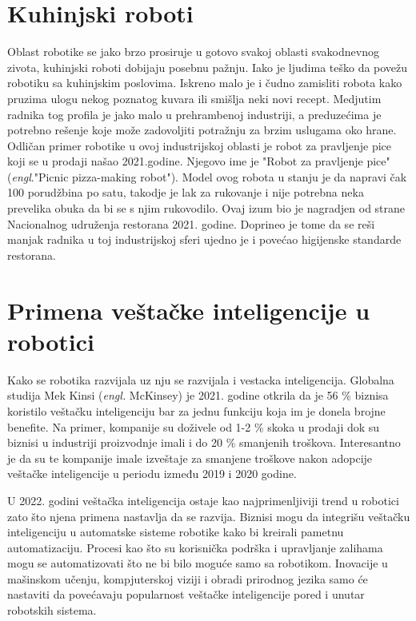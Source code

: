 \documentclass{article}
\begin{document}
\section{Kuhinjski roboti}
Oblast robotike se jako brzo prosiruje u gotovo svakoj oblasti svakodnevnog zivota, kuhinjski roboti dobijaju posebnu pažnju. Iako je ljudima teško da povežu robotiku sa kuhinjskim poslovima. Iskreno malo je i čudno zamisliti robota kako pruzima ulogu nekog poznatog kuvara ili smišlja neki novi recept. Medjutim radnika tog profila je jako malo u prehrambenoj industriji, a preduzećima je potrebno rešenje koje može zadovoljiti potražnju za brzim uslugama oko hrane. Odličan primer robotike u ovoj industrijskoj oblasti je robot za pravljenje pice koji se u prodaji našao 2021.godine. Njegovo ime je "Robot za pravljenje pice" (\emph{engl}."Picnic pizza-making robot")\cite{robotics2022}. Model ovog robota u stanju je da napravi čak 100 porudžbina po satu, takodje je lak za rukovanje i nije potrebna neka prevelika obuka da bi se s njim rukovodilo. Ovaj izum bio je nagradjen od strane Nacionalnog udruženja restorana 2021. godine. Doprineo je tome da se reši manjak radnika u toj industrijskoj sferi ujedno je i povećao higijenske standarde restorana.\cite{foodservice robots}


\section{Primena veštačke inteligencije u robotici}
Kako se robotika razvijala uz nju se razvijala i vestacka inteligencija. Globalna studija Mek Kinsi (\emph{engl. }McKinsey)\cite{McKinsey} je 2021. godine
otkrila da je 56 \% biznisa koristilo veštačku inteligenciju bar za jednu funkciju koja im je donela brojne benefite. Na primer, kompanije su doživele od 1-2 \% skoka u prodaji dok su biznisi u industriji proizvodnje
imali i do 20 \% smanjenih troškova. Interesantno je da su te kompanije imale izveštaje za smanjene troškove nakon adopcije veštačke inteligencije
u periodu između 2019 i 2020 godine.\par
U 2022. godini veštačka inteligencija ostaje kao najprimenljiviji trend u robotici zato što njena primena nastavlja da se razvija. Biznisi mogu da integrišu veštačku inteligenciju u automatske sisteme robotike kako bi
kreirali pametnu automatizaciju. Procesi kao što su korisnička podrška i upravljanje zalihama mogu se  automatizovati što ne bi bilo moguće samo sa robotikom. Inovacije u mašinskom učenju, kompjuterskoj viziji i obradi prirodnog jezika samo će nastaviti da povećavaju popularnost veštačke inteligencije pored i unutar robotskih sistema.\cite{robotics2022} 
\end{document}
